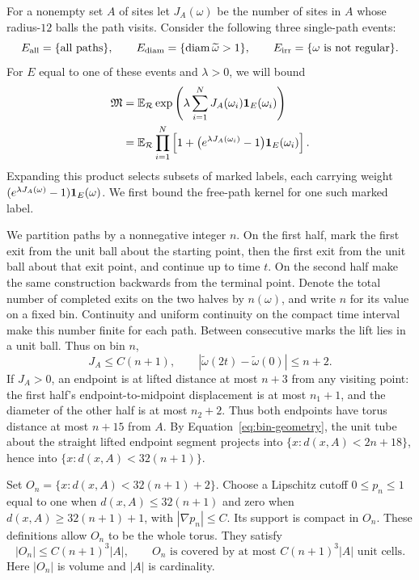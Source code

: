 For a nonempty set $A$ of sites let $J_A(\omega)$ be the
number of sites in $A$ whose radius-$12$ balls the path visits.
Consider the following three single-path events:
\[
 E_{\rm all}=\{\text{all paths}\},\qquad
 E_{\rm diam}=\{\operatorname{diam}\widetilde\omega>1\},\qquad
 E_{\rm irr}=\{\omega\text{ is not regular}\}.
\]
For $E$ equal to one of these events and $\lambda>0$, we will bound
\begin{equation}\label{eq:marked-moment-definition}
 \begin{split}
 \mathfrak M
 &=\mathbb E_{\mathcal R}\exp\left(
   \lambda\sum_{i=1}^N J_A(\omega_i)\mathbf 1_E(\omega_i)\right)\\
 &=\mathbb E_{\mathcal R}\prod_{i=1}^N
   \left[1+\bigl(e^{\lambda J_A(\omega_i)}-1\bigr)
                                      \mathbf 1_E(\omega_i)\right].
 \end{split}
\end{equation}
Expanding this product selects subsets of marked labels, each carrying
weight $(e^{\lambda J_A(\omega)}-1)\mathbf 1_E(\omega)$.
We first bound the free-path kernel for one such marked label.

We partition paths by a nonnegative integer $n$.  On the first
half, mark the first exit from the unit ball about the starting
point, then the first exit from the unit ball about that exit
point, and continue up to time $t$.  On the second half make
the same construction backwards from the terminal point.
Denote the total number of completed exits on the two halves by
$n(\omega)$, and write $n$ for its value on a fixed bin.
Continuity and uniform continuity on the compact time interval
make this number finite for each path.  Between consecutive
marks the lift lies in a unit ball.  Thus on bin $n$,
\begin{equation}\label{eq:bin-geometry}
 J_A\le C(n+1),\qquad
 |\widetilde\omega(2t)-\widetilde\omega(0)|\le n+2.
\end{equation}
If $J_A>0$, an endpoint is at lifted distance at most
$n+3$ from any visiting point: the first half's
endpoint-to-midpoint displacement is at most $n_1+1$,
and the diameter of the other half is at most $n_2+2$.
Thus both endpoints have torus distance at most $n+15$
from $A$.  By Equation~\eqref{eq:bin-geometry}, the unit
tube about the straight lifted endpoint segment projects
into $\{x:d(x,A)<2n+18\}$, hence into
$\{x:d(x,A)<32(n+1)\}$.

Set $O_n=\{x:d(x,A)<32(n+1)+2\}$.  Choose a Lipschitz
cutoff $0\le p_n\le1$ equal to one when
$d(x,A)\le32(n+1)$ and zero when
$d(x,A)\ge32(n+1)+1$, with $|\nabla p_n|\le C$.
Its support is compact in $O_n$.  These definitions
allow $O_n$ to be the whole torus.  They satisfy
\begin{equation}\label{eq:bin-volume}
 |O_n|\le C(n+1)^3|A|,
 \qquad O_n\text{ is covered by at most }C(n+1)^3|A|
 \text{ unit cells}.
\end{equation}
Here $|O_n|$ is volume and $|A|$ is cardinality.

